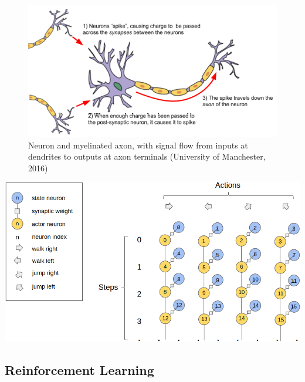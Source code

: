 \documentclass[10pt]{article}
\begin{document}
    \begin{figure}[b]
    \center
    \includegraphics[width=140mm]{./neurons.png}
    \caption{Neuron and myelinated axon, with signal flow from inputs at dendrites to outputs at axon terminals (University of Manchester, 2016)}
    \label{fig:neurons}
    \end{figure}

    \setcounter{suppfigure}{4}

    \begin{suppfigure*}[b]
    \center
    \includegraphics[width=155mm]{./neuronsWideLegend.png}
    \caption{Diagram showing how the synaptic weights between the state neurons and the actor neurons encode the policy of the agent.}
    \label{fig:stateActor}
    \end{suppfigure*}

    \subsection{Reinforcement Learning}
\end{document}
